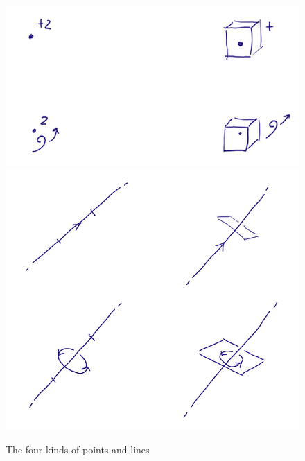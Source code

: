 \documentclass[\ifafour a4paper,12pt,\else a5paper,10pt,\fi%
onecolumn,oneside,article,%
british%
]{memoir}
\theoremstyle{remark}
\theoremstyle{innote}
\renewcommand*{\|}{\nonscript\,\vert\nonscript\;\mathopen{}}
\begin{document}
\begin{figure}[p!]%
 \centering\includegraphics[width=0.9\linewidth]{ex0b.png}\\[5em]\includegraphics[width=0.9\linewidth]{ex1b.png}%
\caption{The four kinds of points and lines}\label{fig:points_lines}
\end{figure}%
\end{document}
